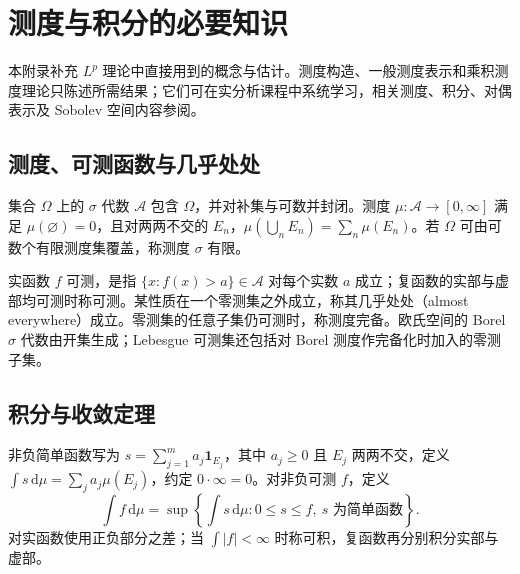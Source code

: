 \documentclass[UTF8,12pt,a4paper,fontset=fandol]{ctexbook}
\begin{document}
\appendix

\chapter{测度与积分的必要知识}
\label{app:fa-measure}

本附录补充 $L^p$ 理论中直接用到的概念与估计。测度构造、一般测度表示和乘积测度理论只陈述所需结果；它们可在实分析课程中系统学习，相关测度、积分、对偶表示及 Sobolev 空间内容参阅\cite{teschl-ra}。

\section{测度、可测函数与几乎处处}
集合 $\Omega$ 上的 $\sigma$ 代数 $\mathcal A$ 包含 $\Omega$，并对补集与可数并封闭。测度 $\mu:\mathcal A\to[0,\infty]$ 满足 $\mu(\varnothing)=0$，且对两两不交的 $E_n$，$\mu(\bigcup_nE_n)=\sum_n\mu(E_n)$。若 $\Omega$ 可由可数个有限测度集覆盖，称测度 $\sigma$ 有限。

实函数 $f$ 可测，是指 $\{x:f(x)>a\}\in\mathcal A$ 对每个实数 $a$ 成立；复函数的实部与虚部均可测时称可测。某性质在一个零测集之外成立，称其几乎处处（almost everywhere）成立。零测集的任意子集仍可测时，称测度完备。欧氏空间的 Borel $\sigma$ 代数由开集生成；Lebesgue 可测集还包括对 Borel 测度作完备化时加入的零测子集。

\section{积分与收敛定理}
非负简单函数写为 $s=\sum_{j=1}^ma_j\mathbf1_{E_j}$，其中 $a_j\geq0$ 且 $E_j$ 两两不交，定义 $\int s\,\mathrm d\mu=\sum_ja_j\mu(E_j)$，约定 $0\cdot\infty=0$。对非负可测 $f$，定义
\[
 \int f\,\mathrm d\mu=\sup\left\{\int s\,\mathrm d\mu:0\leq s\leq f,\ s\text{ 为简单函数}\right\}.
\]
对实函数使用正负部分之差；当 $\int|f|<\infty$ 时称可积，复函数再分别积分实部与虚部。
\end{document}
